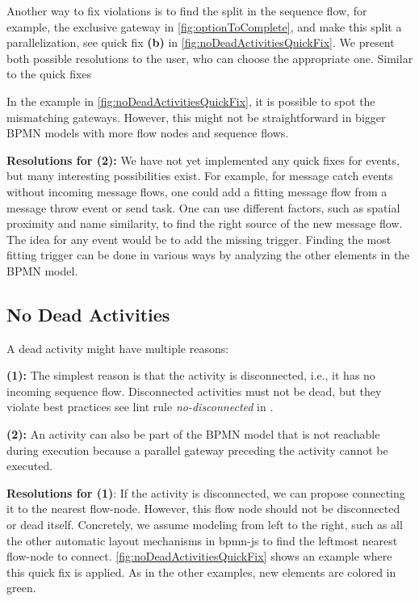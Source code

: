 \documentclass[runningheads]{llncs}
\begin{document}
Another way to fix violations is to find the split in the sequence flow, for example, the exclusive gateway in \autoref{fig:optionToComplete}, and make this split a parallelization, see quick fix \textbf{(b)} in \autoref{fig:noDeadActivitiesQuickFix}.
We present both possible resolutions to the user, who can choose the appropriate one.
Similar to the quick fixes

In the example in \autoref{fig:noDeadActivitiesQuickFix}, it is possible to spot the mismatching gateways.
However, this might not be straightforward in bigger BPMN models with more flow nodes and sequence flows.

\textbf{Resolutions for (2):} We have not yet implemented any quick fixes for events, but many interesting possibilities exist.
For example, for message catch events without incoming message flows, one could add a fitting message flow from a message throw event or send task.
One can use different factors, such as spatial proximity and name similarity, to find the right source of the new message flow.
The idea for any event would be to add the missing trigger.
Finding the most fitting trigger can be done in various ways by analyzing the other elements in the BPMN model.


\subsection{No Dead Activities}
A dead activity might have multiple reasons:

\textbf{(1):} The simplest reason is that the activity is disconnected, i.e., it has no incoming sequence flow.
Disconnected activities must not be dead, but they violate best practices see lint rule \textit{no-disconnected} in \cite{camundaservicesgmbhBpmnlint2024}.

\textbf{(2):} An activity can also be part of the BPMN model that is not reachable during execution because a parallel gateway preceding the activity cannot be executed.

\textbf{Resolutions for (1)}: If the activity is disconnected, we can propose connecting it to the nearest flow-node.
However, this flow node should not be disconnected or dead itself.
Concretely, we assume modeling from left to the right, such as all the other automatic layout mechanisms in bpmn-js \cite{camundaservicesgmbhBpmnjs2024} to find the leftmost nearest flow-node to connect.
\autoref{fig:noDeadActivitiesQuickFix} shows an example where this quick fix is applied.
As in the other examples, new elements are colored in green.
\end{document}
